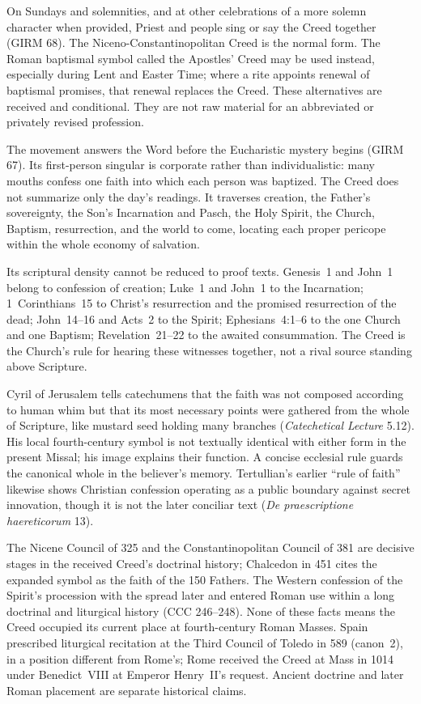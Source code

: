 On Sundays and solemnities, and at other celebrations of a more solemn character when provided, Priest and people sing or say the Creed together (GIRM 68). The Niceno-Constantinopolitan Creed is the normal form. The Roman baptismal symbol called the Apostles' Creed may be used instead, especially during Lent and Easter Time; where a rite appoints renewal of baptismal promises, that renewal replaces the Creed. These alternatives are received and conditional. They are not raw material for an abbreviated or privately revised profession.

The movement answers the Word before the Eucharistic mystery begins (GIRM 67). Its first-person singular is corporate rather than individualistic: many mouths confess one faith into which each person was baptized. The Creed does not summarize only the day's readings. It traverses creation, the Father's sovereignty, the Son's Incarnation and Pasch, the Holy Spirit, the Church, Baptism, resurrection, and the world to come, locating each proper pericope within the whole economy of salvation.

Its scriptural density cannot be reduced to proof texts. Genesis~1 and John~1 belong to confession of creation; Luke~1 and John~1 to the Incarnation; 1~Corinthians~15 to Christ's resurrection and the promised resurrection of the dead; John~14--16 and Acts~2 to the Spirit; Ephesians~4:1--6 to the one Church and one Baptism; Revelation~21--22 to the awaited consummation. The Creed is the Church's rule for hearing these witnesses together, not a rival source standing above Scripture.

Cyril of Jerusalem tells catechumens that the faith was not composed according to human whim but that its most necessary points were gathered from the whole of Scripture, like mustard seed holding many branches (\emph{Catechetical Lecture} 5.12). His local fourth-century symbol is not textually identical with either form in the present Missal; his image explains their function. A concise ecclesial rule guards the canonical whole in the believer's memory. Tertullian's earlier ``rule of faith'' likewise shows Christian confession operating as a public boundary against secret innovation, though it is not the later conciliar text (\emph{De praescriptione haereticorum} 13).

The Nicene Council of 325 and the Constantinopolitan Council of 381 are decisive stages in the received Creed's doctrinal history; Chalcedon in 451 cites the expanded symbol as the faith of the 150 Fathers. The Western confession of the Spirit's procession with the  spread later and entered Roman use within a long doctrinal and liturgical history (CCC 246--248). None of these facts means the Creed occupied its current place at fourth-century Roman Masses. Spain prescribed liturgical recitation at the Third Council of Toledo in 589 (canon~2), in a position different from Rome's; Rome received the Creed at Mass in 1014 under Benedict~VIII at Emperor Henry~II's request. Ancient doctrine and later Roman placement are separate historical claims.

